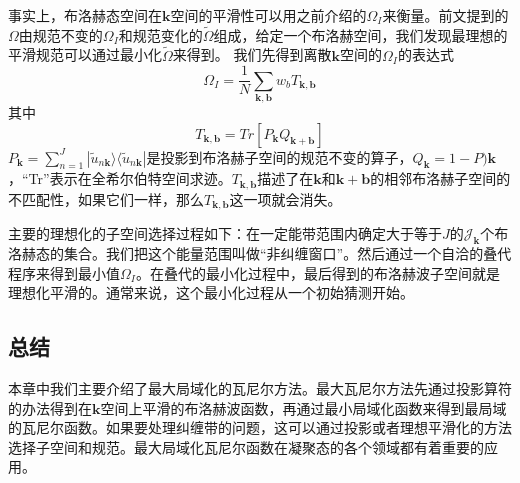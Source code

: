 事实上，布洛赫态空间在$\bm{k}$空间的平滑性可以用之前介绍的$\Omega_I$来衡量。前文提到的$\Omega$由规范不变的$\Omega_I$和规范变化的$\widetilde \Omega$组成，给定一个布洛赫空间，我们发现最理想的平滑规范可以通过最小化$\widetilde \Omega$来得到。
我们先得到离散$\bm{k}$空间的$\Omega_I$的表达式
\begin{equation}
\Omega_I=\frac{1}{N}\sum_{\bm{k},\bm{b}}w_bT_{\bm{k},\bm{b}}
\end{equation}
其中
\begin{equation}
T_{\bm{k},\bm{b}}=Tr[P_{\bm{k}}Q_{\bm{k+b}}]
\end{equation}
$P_{\bm{k}}=\sum_{n=1}^{J}|\widetilde u_{n \bm{k}}\rangle \langle\widetilde u_{n \bm{k}}|$是投影到布洛赫子空间的规范不变的算子，$Q_{\bm{k}}=1-P){\bm{k}}$，“Tr”表示在全希尔伯特空间求迹。$T_{\bm{k},\bm{b}}$描述了在$\bm{k}$和$\bm{k+b}$的相邻布洛赫子空间的不匹配性，如果它们一样，那么$T_{\bm{k},\bm{b}}$这一项就会消失。

主要的理想化的子空间选择过程如下：在一定能带范围内确定大于等于$J$的$\mathcal{J}_{\bm{k}}$个布洛赫态的集合。我们把这个能量范围叫做“非纠缠窗口”。然后通过一个自洽的叠代程序来得到最小值$\Omega_I$。在叠代的最小化过程中，最后得到的布洛赫波子空间就是理想化平滑的。通常来说，这个最小化过程从一个初始猜测开始。

\subsection{总结}
本章中我们主要介绍了最大局域化的瓦尼尔方法。最大瓦尼尔方法先通过投影算符的办法得到在$\bm{k}$空间上平滑的布洛赫波函数，再通过最小局域化函数来得到最局域的瓦尼尔函数。如果要处理纠缠带的问题，这可以通过投影或者理想平滑化的方法选择子空间和规范。最大局域化瓦尼尔函数在凝聚态的各个领域都有着重要的应用。